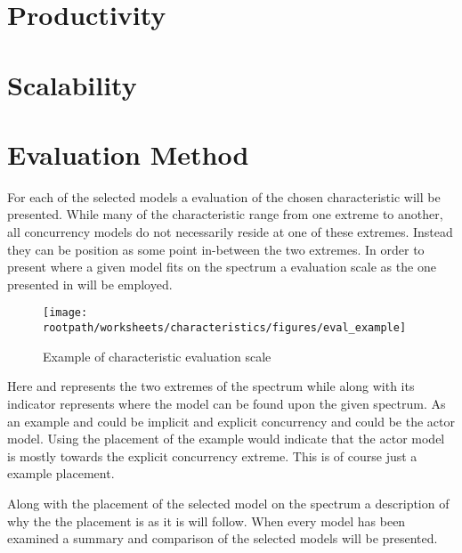 \section{Productivity}

\section{Scalability}

\section{Evaluation Method}
For each of the selected models a evaluation of the chosen characteristic will be presented. While many of the characteristic range from one extreme to another, all concurrency models do not necessarily reside at one of these extremes. Instead they can be position as some point in-between the two extremes. In order to present where a given model fits on the spectrum a evaluation scale as the one presented in  will be employed. 

\begin{figure}[ht!]
\centering
\texttt{[image: \\rootpath/worksheets/characteristics/figures/eval\_example]}
\caption{Example of characteristic evaluation scale}\label{fig:char_evel_example}
\end{figure}

Here  and  represents the two extremes of the spectrum while  along with its indicator represents where the model  can be found upon the given spectrum. As an example  and  could be implicit and explicit concurrency and  could be the actor model. Using the placement of the example  would indicate that the actor model is mostly towards the explicit concurrency extreme. This is of course just a example placement.

Along with the placement of the selected model on the spectrum a description of why the the placement is as it is will follow. When every model has been examined a summary and comparison of the selected models will be presented.
\worksheetend
